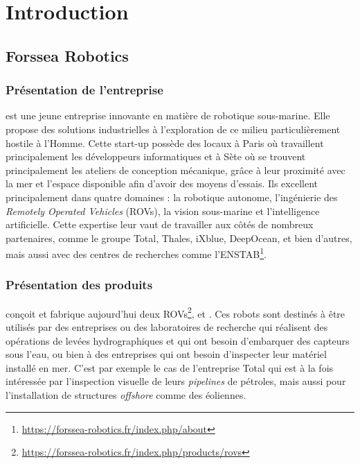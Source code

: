 \chapter{Introduction}
\label{chapter:introduction}
	
	\section{Forssea Robotics}

		\subsection{Présentation de l'entreprise}

			\forssea{} est une jeune entreprise innovante en matière de robotique sous-marine. Elle propose des solutions industrielles à l'exploration de ce milieu particulièrement hostile à l'Homme. Cette start-up possède des locaux à Paris où travaillent principalement les développeurs informatiques et à Sète où se trouvent principalement les ateliers de conception mécanique, grâce à leur proximité avec la mer et l'espace disponible afin d'avoir des moyens d'essais. Ils excellent principalement dans quatre domaines : la robotique autonome, l'ingénierie des \textit{Remotely Operated Vehicles} (\gls{ROV}s), la vision sous-marine et l'intelligence artificielle. Cette expertise leur vaut de travailler aux côtés de nombreux partenaires, comme le groupe Total, Thales, iXblue, DeepOcean, et bien d'autres, mais aussi avec des centres de recherches comme l'\gls{ENSTAB}\footnote{\url{https://forssea-robotics.fr/index.php/about}}.

		\subsection{Présentation des produits}

			\forssea{} conçoit et fabrique aujourd'hui deux \gls{ROV}s\footnote{\url{https://forssea-robotics.fr/index.php/products/rovs}}, \argos{} et \atoll{}. Ces robots sont destinés à être utilisés par des entreprises ou des laboratoires de recherche qui réalisent des opérations de levées hydrographiques et qui ont besoin d'embarquer des capteurs sous l'eau, ou bien à des entreprises qui ont besoin d'inspecter leur matériel installé en mer. C'est par exemple le cas de l'entreprise Total qui est à la fois intéressée par l'inspection visuelle de leurs \textit{pipelines} de pétroles, mais aussi pour l'installation de structures \textit{offshore} comme des éoliennes.
			
